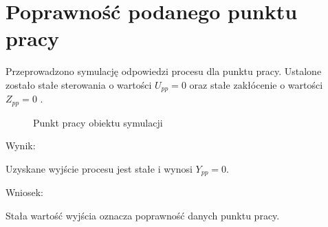 \section{Poprawność podanego punktu pracy}
\label{projekt:zad1}
Przeprowadzono symulację odpowiedzi procesu dla punktu pracy. 
Ustalone zostało stałe sterowania o wartości $U_{pp} = 0$ oraz stałe zakłócenie o wartości $Z_{pp}=0$ .

\begin{figure}[H] 
    \centering
    
    \caption{Punkt pracy obiektu symulacji}
    \label{fig_zad1charstat_u_y_z}
\end{figure}

Wynik: 

Uzyskane wyjście procesu jest stałe i wynosi $Y_{pp}=0$.

Wniosek: 

Stała wartość wyjścia oznacza poprawność danych punktu pracy.
